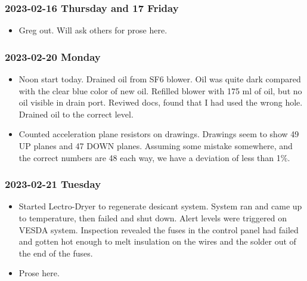 \documentclass{scrartcl}
\begin{document}
\subsubsection{2023-02-16 Thursday and 17 Friday}
\begin{itemize}
	\item Greg out.  Will ask others for prose here.
\end{itemize}

\subsubsection{2023-02-20 Monday}
\begin{itemize}
	\item Noon start today.  Drained oil from SF6 blower.  Oil was quite
	dark compared with the clear blue color of new oil.  Refilled blower
	with 175 ml of oil, but no oil visible in drain port.  Reviwed docs, 
	found that I had used the wrong hole. Drained oil to the correct 
	level.  
	\item Counted acceleration plane resistors on drawings.  Drawings 
	seem to show 49 UP planes and 47 DOWN planes.  Assuming some 
	mistake somewhere, and the correct numbers are 48 each way, we have 
	a deviation of less than 1\%.  
\end{itemize}

\subsubsection{2023-02-21 Tuesday}
\begin{itemize}
	\item Started Lectro-Dryer to regenerate desicant system.  System ran 
	and came up to temperature, then failed and shut down.  Alert levels 
	were triggered on VESDA system.  Inspection revealed the fuses in
	the control panel had failed and gotten hot enough to melt insulation
	on the wires and the solder out of the end of the fuses.
	\item Prose here.
\end{itemize}
\end{document}
